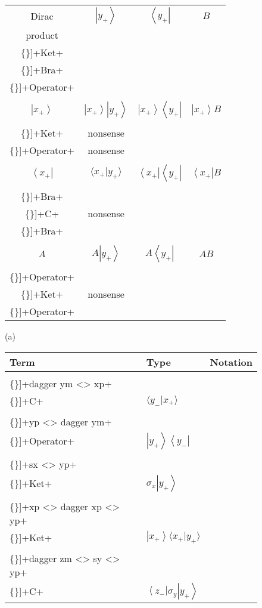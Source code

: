 \documentclass[12pt]{article}
\newcommand{\VERB}{\Verb[commandchars=\\\{\}]}
\newcommand{\DataTypeTok}[1]{\textcolor[rgb]{0.56,0.13,0.00}{{#1}}}
\newcommand{\FunctionTok}[1]{\textcolor[rgb]{0.02,0.16,0.49}{{#1}}}
\newcommand{\OperatorTok}[1]{\textcolor[rgb]{0.40,0.40,0.40}{{#1}}}
\newcommand{\ket}[1]{\left| #1 \right\rangle}
\newcommand{\bra}[1]{\left\langle #1 \right|}
\begin{document}
\begin{figure}
\begin{center}
  \begin{tabular}{c|ccc}
    Dirac       & $\ket{y_+}$ & $\bra{y_+}$ & $B$ \\
    product     & \VERB+\DataTypeTok{Ket}+ & \VERB+\DataTypeTok{Bra}+ & \VERB+\DataTypeTok{Operator}+ \\ \hline
                & \\
    $\ket{x_+}$ & $\ket{x_+} \ket{y_+}$ & $\ket{x_+} \bra{y_+}$ & $\ket{x_+} B$ \\
  \VERB+\DataTypeTok{Ket}+             & nonsense             & \VERB+\DataTypeTok{Operator}+ & nonsense \\
                & \\
    $\bra{x_+}$ & $\langle x_+ | y_+ \rangle$ & $\bra{x_+} \bra{y_+}$ & $\bra{x_+} B$  \\
  \VERB+\DataTypeTok{Bra}+ & \VERB+\DataTypeTok{C}+ & nonsense & \VERB+\DataTypeTok{Bra}+ \\
                & \\
    $A$         & $A \ket{y_+}$ & $A \bra{y_+}$ & $A B$ \\
  \VERB+\DataTypeTok{Operator}+ & \VERB+\DataTypeTok{Ket}+ & nonsense & \VERB+\DataTypeTok{Operator}+
  \end{tabular}

(a)
\end{center}
\begin{center}
\begin{tabular}{lll}
Term & Type & Notation \\ \hline
\VERB+\FunctionTok{dagger} \FunctionTok{ym} \OperatorTok{<>} \FunctionTok{xp}+
  & \VERB+\DataTypeTok{C}+
  & $\langle y_- | x_+ \rangle$ \\
\VERB+\FunctionTok{yp} \OperatorTok{<>} \FunctionTok{dagger} \FunctionTok{ym}+
  & \VERB+\DataTypeTok{Operator}+
  & $\ket{y_+} \bra{y_-}$ \\
\VERB+\FunctionTok{sx} \OperatorTok{<>} \FunctionTok{yp}+
  & \VERB+\DataTypeTok{Ket}+
  & $\sigma_x \ket{y_+}$ \\
\VERB+\FunctionTok{xp} \OperatorTok{<>} \FunctionTok{dagger} \FunctionTok{xp} \OperatorTok{<>} \FunctionTok{yp}+
  & \VERB+\DataTypeTok{Ket}+
  & $\ket{x_+} \langle x_+ | y_+ \rangle$ \\
\VERB+\FunctionTok{dagger} \FunctionTok{zm} \OperatorTok{<>} \FunctionTok{sy} \OperatorTok{<>} \FunctionTok{yp}+
  & \VERB+\DataTypeTok{C}+
  & $\bra{z_-} \sigma_y \ket{y_+}$
\end{tabular}


\end{center}
\end{figure}
\end{document}
